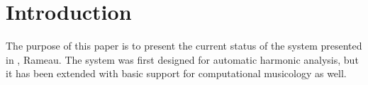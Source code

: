 \section{Introduction}

The purpose of this paper is to present the current status of the
system presented in \cite{kroger08:rameau}, Rameau. The system was
first designed for automatic harmonic analysis, but it has been
extended with basic support for computational musicology as well.



